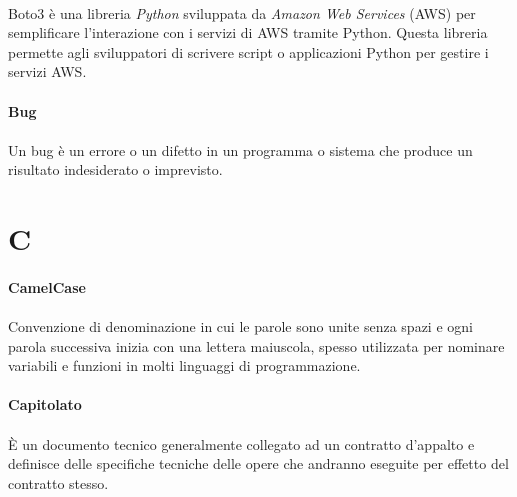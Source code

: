 \documentclass[10pt, a4paper]{article}
\begin{document}
\paragraph{}Boto3 è una libreria \textit{Python\pg} sviluppata da \textit{Amazon Web Services\pg} (AWS) per semplificare l'interazione con i servizi di AWS tramite Python. Questa libreria permette agli sviluppatori di scrivere script o applicazioni Python per gestire i servizi AWS.

\vspace{2em}
\paragraph{Bug}\noindent\hrulefill
\paragraph{}Un bug è un errore o un difetto in un programma o sistema che produce un risultato indesiderato o imprevisto.





\newpage
\section{C}

\vspace{2em}
\paragraph{CamelCase}\noindent\hrulefill
\paragraph{}Convenzione di denominazione in cui le parole sono unite senza spazi e ogni parola successiva inizia con una lettera maiuscola, spesso utilizzata per nominare variabili e funzioni in molti linguaggi di programmazione.


\vspace{2em}
\paragraph{Capitolato}\noindent\hrulefill\noindent\hrulefill
\paragraph{} È un documento tecnico generalmente collegato ad un contratto d'appalto e definisce delle specifiche tecniche delle opere che andranno eseguite per effetto del contratto stesso.
\end{document}
